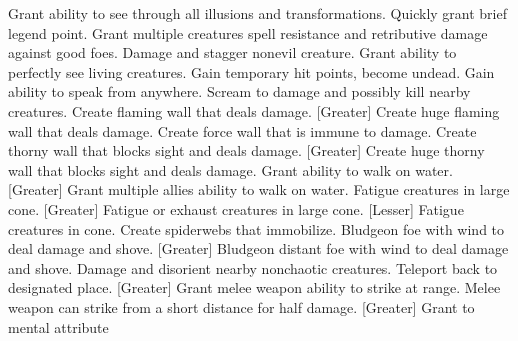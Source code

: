     {Grant ability to see through all illusions and transformations.}
    {Quickly grant brief legend point.}
    {Grant multiple creatures spell resistance and retributive damage against good foes.}
    {Damage and stagger nonevil creature.}
    {Grant ability to perfectly see living creatures.}
    {Gain temporary hit points, become undead.}
    {Gain ability to speak from anywhere.}
    {Scream to damage and possibly kill nearby creatures.}
    {Create flaming wall that deals damage.}
[Greater]
    {Create huge flaming wall that deals damage.}
    {Create force wall that is immune to damage.}
    {Create thorny wall that blocks sight and deals damage.}
[Greater]
    {Create huge thorny wall that blocks sight and deals damage.}
    {Grant ability to walk on water.}
[Greater]
    {Grant multiple allies ability to walk on water.}
    {Fatigue creatures in large cone.}
[Greater]
    {Fatigue or exhaust creatures in large cone.}
[Lesser]
    {Fatigue creatures in cone.}
    {Create spiderwebs that immobilize.}
    {Bludgeon foe with wind to deal damage and shove.}
[Greater]
    {Bludgeon distant foe with wind to deal damage and shove.}
    {Damage and disorient nearby nonchaotic creatures.}
    {Teleport back to designated place.}
[Greater]
    {Grant melee weapon ability to strike at range.}
    {Melee weapon can strike from a short distance for half damage.}
[Greater]
    {Grant  to mental attribute}
